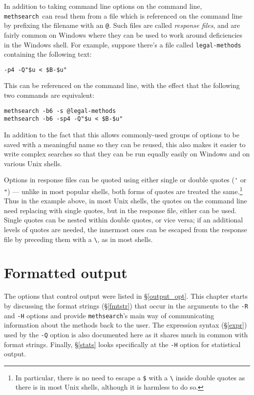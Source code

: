 \documentclass[a4paper,11pt,oneside]{book}
\makeatletter
\newcommand{\oi}[1]{\index{#1@{\hspace*{-\optwidth}\texttt{-}\texttt{#1}}}}
\def\methsearch{\texttt{meth\-search}}
\newcommand{\sref}[1]{\hyperref[#1]{\S\ref{#1}}}
\makeatother
\begin{document}
In addition to taking command line options on the command line, \methsearch\ 
can read them from a file which is referenced on the command line by
prefixing the filename with an \verb+@+.  Such files are called 
\textit{response files}, and are fairly common on Windows where they can be 
used to work around deficiencies in the Windows shell.  For example, suppose
there's a file called \verb+legal-methods+ containing the following text:
\begin{Verbatim}
-p4 -Q"$u < $B-$u"
\end{Verbatim}
This can be referenced on the command line, with the effect that the 
following two commands are equivalent:
\begin{Verbatim}
methsearch -b6 -s @legal-methods
methsearch -b6 -sp4 -Q"$u < $B-$u"
\end{Verbatim}

In addition to the fact that this allows commonly-used groups of 
options to be saved with a meaningful name so they can be reused,
this also makes it easier to write complex searches so that they can
be run equally easily on Windows and on various Unix shells.

Options in response files can be quoted using either single or double
quotes (\verb+'+ or \verb+"+) --- unlike in most popular shells, both forms of 
quotes are treated the same.\footnote{In particular, there is no need to 
escape a \verb+$+ with a \verb+\+ inside double quotes as there is in most 
Unix shells,\index{shell!escaping} although it is harmless to do so.}
Thus in the example above, in most Unix shells, the quotes on the command
line need replacing with single quotes, but in the response file, either
can be used.\index{shell!quotation}
Single quotes can be nested within double quotes, or vice versa; if an
additional levels of quotes are needed, the innermost ones can be escaped
from the response file by preceding them with a \verb+\+, as in
most shells. 



\chapter{Formatted output}\label{fmtout}

The options that control output were listed in \sref{output_opt}.  
This chapter starts by discussing the format strings (\sref{fmtstr}) 
that occur in the arguments to the \verb+-R+\oi{R} and \verb+-H+\oi{H} 
options and provide \methsearch's main way of communicating 
information about the methods back to the user.  
The expression syntax (\sref{expr}) used by the \verb+-Q+\oi{Q} 
option is also documented here as it shares much in common with format strings.
Finally, \sref{stats} looks specifically at the \verb+-H+ option for 
statistical output.
\end{document}
